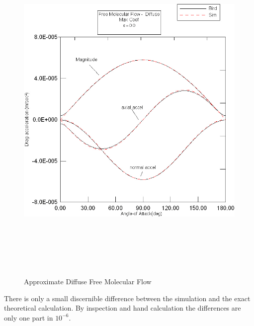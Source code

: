 \begin{description}
\begin{figure}[hbpt]
\includegraphics [height=175mm]{figs/diffuse_max.jpg}
\caption{Approximate Diffuse Free Molecular Flow}
\label{fig:2_1}
\end{figure}
There is only a small discernible difference between the simulation and the exact
theoretical calculation. By inspection and hand calculation the
differences are only one part in $10^{-6}$.
\end{description}

